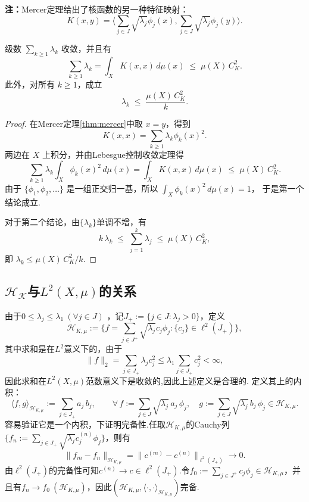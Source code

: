 \documentclass[../master.tex]{subfiles}
\begin{document}
\noindent\textbf{注：}Mercer定理给出了核函数的另一种特征映射：
\begin{equation*}
    K(x,y) =\langle \sum_{j\in J}\sqrt{\lambda_j}\phi_j(x),\sum_{j\in J}\sqrt{\lambda_j}\phi_j(y)\rangle.
\end{equation*}



\begin{corollary}
级数 $\sum_{k\geq 1}\lambda_k$ 收敛，并且有
\[
\sum_{k\geq 1}\lambda_k
= \int_X K(x,x)\,d\mu(x)
\;\leq\; \mu(X)\,C_K^2.
\]
此外，对所有 $k\geq 1$，成立
\[
\lambda_k \;\leq\; \frac{\mu(X)\,C_K^2}{k}.
\]
\end{corollary}

\begin{proof}
在Mercer定理\ref{thm:mercer}中取 $x=y$，得到
\[
K(x,x)=\sum_{k\geq 1}\lambda_k \phi_k(x)^2.
\]
两边在 $X$ 上积分，并由Lebesgue控制收敛定理得
\[
\sum_{k\geq 1}\lambda_k\int_X \phi_k(x)^2\,d\mu(x)
=\int_X K(x,x)\,d\mu(x)
\;\leq\;\mu(X)\,C_K^2.
\]
由于 $\{\phi_1,\phi_2,\dots\}$ 是一组正交归一基，所以
\(\int_X \phi_k(x)^2\,d\mu(x)=1\)，
于是第一个结论成立.

对于第二个结论，由$\{\lambda_k\}$单调不增，有
\[
k\,\lambda_k \;\leq\;\sum_{j=1}^k \lambda_j
\;\leq\;\mu(X)\,C_K^2,
\]
即
\(\lambda_k \leq \mu(X)\,C_K^2/k\).
\end{proof}



\subsection{$\mathcal{H_K}$与$L^2(X,\mu)$的关系}
由于$0\leq \lambda_j\leq \lambda_1~(\forall j\in J)$
，记$J_+:=\{j\in J:\lambda_j>0\}$，定义
\begin{equation*}
    \mathcal{H}_{K,\mu}:=\{f=\sum_{j\in J^+}\sqrt{\lambda_j}c_j\phi_j:\{c_j\}\in\ell^2(J_+)\},
\end{equation*}
其中求和是在$L^2$意义下的，由于
\begin{equation*}
    \|f\|_2 = \sum_{j\in J_+}\lambda_j c_j^2\leq \lambda_1\sum_{j\in J_+}c_j^2<\infty,
\end{equation*}
因此求和在$L^2(X,\mu)$范数意义下是收敛的,因此上述定义是合理的. 定义其上的内积：
\begin{equation}\label{eq: H_Kmu 内积}
    \langle f , g \rangle_{\mathcal{H}_{K,\mu}}
:= \sum_{j\in J_+} a_j\,b_j,
\qquad
\forall\, 
f := \sum_{j\in J} \sqrt{\lambda_j}\, a_j\, \phi_j,\quad
g := \sum_{j\in J} \sqrt{\lambda_j}\, b_j\, \phi_j \in \mathcal{H}_{K,\mu}.
\end{equation}
容易验证它是一个内积，下证明完备性.任取$\mathcal{H}_{K,\mu}$的Cauchy列$\{f_n:=\sum_{j\in J_+}\sqrt{\lambda_j}c^{(n)}_j\phi_j\}$，则有
\begin{equation*}
    \|f_m - f_n\|_{\mathcal{H}_{K,\mu}} = \|c^{(m)}-c^{(n)}\|_{\ell^2(J_+)}\to 0.
\end{equation*}
由$\ell^2(J_+)$的完备性可知$c^{(n)}\to c\in\ell^2(J_+).$令$f_0:=\sum_{j\in J^+}c_j\phi_j\in\mathcal{H}_{K,\mu}$，并且有$f_n\to f_0~(\mathcal{H}_{K,\mu})$，因此$\left(\mathcal{H}_{K,\mu},\langle\cdot,\cdot\rangle_{\mathcal{H}_{K,\mu}}\right)$完备.
\end{document}
